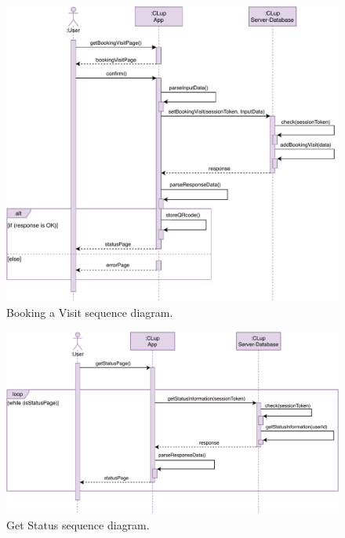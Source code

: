 \begin{figure}[H]
	\centering
	\includegraphics[width=1.0\textwidth]{images/bookingVisit_sequence_diagram.pdf}
	\caption{Booking a Visit sequence diagram.}
\end{figure}

\begin{figure}[H]
	\centering
	\includegraphics[width=1.0\textwidth]{images/getStatusPage_sequence_diagram.pdf}
	\caption{Get Status sequence diagram.}
\end{figure}

